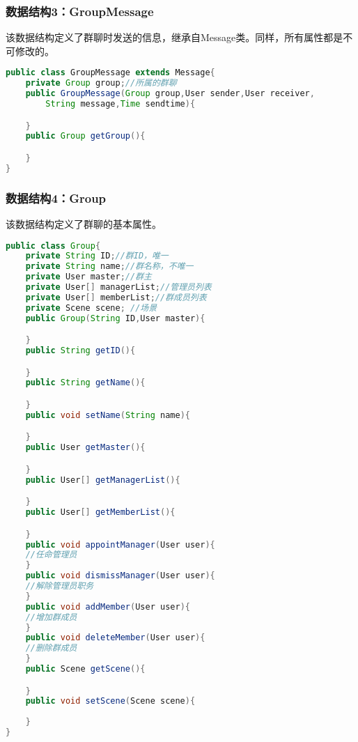 \subsubsection{数据结构3：GroupMessage}
该数据结构定义了群聊时发送的信息，继承自Message类。同样，所有属性都是不可修改的。
\begin{lstlisting}[language=Java, caption=GroupMessage定义]
public class GroupMessage extends Message{
    private Group group;//所属的群聊
    public GroupMessage(Group group,User sender,User receiver,
        String message,Time sendtime){

    }
    public Group getGroup(){

    }
}
\end{lstlisting}

\subsubsection{数据结构4：Group}
该数据结构定义了群聊的基本属性。
\begin{lstlisting}[language=Java, caption=Group定义]
public class Group{
    private String ID;//群ID，唯一
    private String name;//群名称，不唯一
    private User master;//群主
    private User[] managerList;//管理员列表
    private User[] memberList;//群成员列表
    private Scene scene; //场景
    public Group(String ID,User master){

    }
    public String getID(){

    }
    public String getName(){

    }
    public void setName(String name){

    }
    public User getMaster(){

    }
    public User[] getManagerList(){

    }
    public User[] getMemberList(){

    }
    public void appointManager(User user){
    //任命管理员
    }
    public void dismissManager(User user){
    //解除管理员职务
    }
    public void addMember(User user){
    //增加群成员
    }
    public void deleteMember(User user){
    //删除群成员
    }
    public Scene getScene(){

    }
    public void setScene(Scene scene){
        
    }
}
\end{lstlisting}








